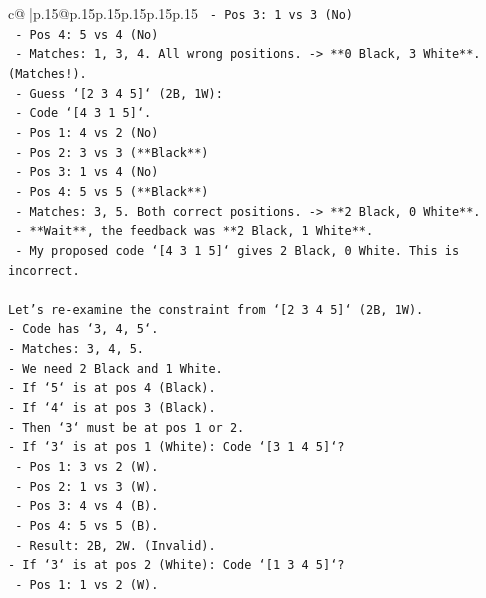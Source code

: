 \documentclass{article}
\begin{document}
{\begin{supertabular}{c@{$\;$}|p{.15\linewidth}@{}p{.15\linewidth}p{.15\linewidth}p{.15\linewidth}p{.15\linewidth}p{.15\linewidth}}
{{{\texttt{            {-} Pos 3: 1 vs 3 (No)} \\
\texttt{            {-} Pos 4: 5 vs 4 (No)} \\
\texttt{            {-} Matches: 1, 3, 4. All wrong positions. {-}> **0 Black, 3 White**. (Matches!).} \\
\texttt{        {-} Guess `{[}2 3 4 5{]}` (2B, 1W):} \\
\texttt{            {-} Code `{[}4 3 1 5{]}`.} \\
\texttt{            {-} Pos 1: 4 vs 2 (No)} \\
\texttt{            {-} Pos 2: 3 vs 3 (**Black**)} \\
\texttt{            {-} Pos 3: 1 vs 4 (No)} \\
\texttt{            {-} Pos 4: 5 vs 5 (**Black**)} \\
\texttt{            {-} Matches: 3, 5. Both correct positions. {-}> **2 Black, 0 White**.} \\
\texttt{            {-} **Wait**, the feedback was **2 Black, 1 White**.} \\
\texttt{            {-} My proposed code `{[}4 3 1 5{]}` gives 2 Black, 0 White. This is incorrect.} \\
\\ 
\texttt{Let's re{-}examine the constraint from `{[}2 3 4 5{]}` (2B, 1W).} \\
\texttt{{-} Code has `3, 4, 5`.} \\
\texttt{{-} Matches: 3, 4, 5.} \\
\texttt{{-} We need 2 Black and 1 White.} \\
\texttt{{-} If `5` is at pos 4 (Black).} \\
\texttt{{-} If `4` is at pos 3 (Black).} \\
\texttt{{-} Then `3` must be at pos 1 or 2.} \\
\texttt{{-} If `3` is at pos 1 (White): Code `{[}3 1 4 5{]}`?} \\
\texttt{    {-} Pos 1: 3 vs 2 (W).} \\
\texttt{    {-} Pos 2: 1 vs 3 (W).} \\
\texttt{    {-} Pos 3: 4 vs 4 (B).} \\
\texttt{    {-} Pos 4: 5 vs 5 (B).} \\
\texttt{    {-} Result: 2B, 2W. (Invalid).} \\
\texttt{{-} If `3` is at pos 2 (White): Code `{[}1 3 4 5{]}`?} \\
\texttt{    {-} Pos 1: 1 vs 2 (W).} \\
}}}
\end{supertabular}}
\end{document}
